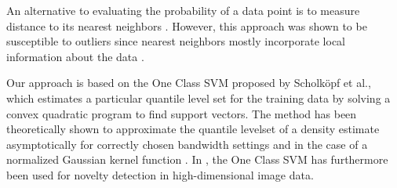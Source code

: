 \documentclass[10pt, conference]{ieeeconf}      %
\begin{document}
An alternative to evaluating the probability of a data point is to measure distance to its nearest neighbors \cite{knox1998algorithms}. However, this approach was shown to be
susceptible to outliers since nearest neighbors mostly incorporate local information about the data \cite{hodge2004survey}.

Our approach is based on the One Class SVM proposed by Scholk{\"o}pf et al., which estimates a particular quantile level set for the training data by solving a convex quadratic program  to find support
vectors. The method has been theoretically shown to approximate the quantile levelset of a density estimate
asymptotically for correctly chosen bandwidth settings and in the case of a normalized Gaussian kernel function \cite{vert2006consistency}. 
In \cite{liu2014unsupervised}, the One Class SVM has furthermore been used for novelty detection in high-dimensional 
image data.


\end{document}
